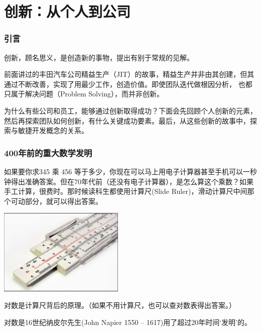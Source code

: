 \chapter{创新：从个人到公司} %

\hypertarget{ux5f15ux8a00}{%
\subsection{引言}\label{ux5f15ux8a00}}

创新，顾名思义，是创造新的事物，提出有别于常规的⻅解。

前⾯讲过的丰⽥汽⻋公司精益⽣产（JIT）的故事，精益⽣产并⾮由其创建，但其通过不断改善，实现了⽤最少⼯作，创造价值。即使团队迭代做根因分析，
也都只属于解决问题（Problem Solving），⽽并⾮创新。

为什么有些公司和员⼯，能够通过创新取得成功？下⾯会先回顾个⼈创新的元素，然后再探索团队如何创新，有什么关键成功要素。最后，从这些创新的故事中，探索与敏捷开发概念的关系。

\hypertarget{ux5e74ux524dux7684ux91cdux5927ux6570ux5b66ux53d1ux660e}{%
\subsection{400年前的重大数学发明}\label{ux5e74ux524dux7684ux91cdux5927ux6570ux5b66ux53d1ux660e}}

如果要你求345 乘 456
等于多少，你现在可以马上用电子计算器甚至手机可以一秒钟得出准确答案。但在70年代前（还没有电子计算器），是怎么算这个乘数？如果手工计算，很费时。那时候读科生都使用计算尺(Slide
Ruler)，滑动计算尺中间那个可动部分，就可以得出答案。


\includegraphics[width=6cm]{SlideRulerScreenshot_2023-07-28_182839.jpg}

对数是计算尺背后的原理。（如果不用计算尺，也可以查对数表得出答案。）

对数是16世纪纳皮尔先生(John Napier 1550 --
1617)用了超过20年时间`发明'的。

